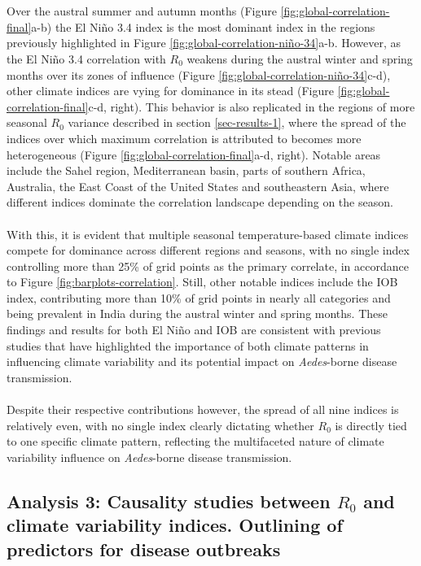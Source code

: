 \documentclass[10pt,twocolumn]{wlscirep}
\begin{document}
\\
\\
Over the austral summer and autumn months (Figure \ref{fig:global-correlation-final}a-b) the El Niño 3.4 index is the most dominant index in the regions previously highlighted in Figure \ref{fig:global-correlation-niño-34}a-b. However, as the El Niño 3.4 correlation with $R_0$ weakens during the austral winter and spring months over its zones of influence (Figure \ref{fig:global-correlation-niño-34}c-d), other climate indices are vying for dominance in its stead (Figure \ref{fig:global-correlation-final}c-d, right). This behavior is also replicated in the regions of more seasonal $R_0$ variance described in section \ref{sec-results-1}, where the spread of the indices over which maximum correlation is attributed to becomes more heterogeneous (Figure \ref{fig:global-correlation-final}a-d, right). Notable areas include the Sahel region, Mediterranean basin, parts of southern Africa, Australia, the East Coast of the United States and southeastern Asia, where different indices dominate the correlation landscape depending on the season.
\\
\\
With this, it is evident that multiple seasonal temperature-based climate indices compete for dominance across different regions and seasons, with no single index controlling more than 25\% of grid points as the primary correlate, in accordance to Figure \ref{fig:barplots-correlation}. Still, other notable indices include the IOB index, contributing more than 10\% of grid points in nearly all categories and being prevalent in India during the austral winter and spring months. These findings and results for both El Niño and IOB are consistent with previous studies that have highlighted the importance of both climate patterns in influencing climate variability and its potential impact on \textit{Aedes}-borne disease transmission\cite{chen_2024,kurnianingsih_2020, banu_2015}.
\\
\\
Despite their respective contributions however, the spread of all nine indices is relatively even, with no single index clearly dictating whether $R_0$ is directly tied to one specific climate pattern, reflecting the multifaceted nature of climate variability influence on \textit{Aedes}-borne disease transmission.

\subsection{Analysis 3: Causality studies between $R_0$ and climate variability indices. Outlining of predictors for disease outbreaks} \label{sec-results-3}
\end{document}
